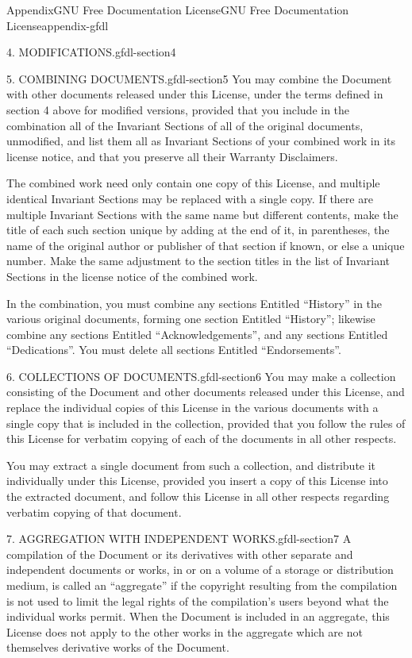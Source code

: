 \documentclass[oneside,10pt,]{book}
\numberwithin{equation}{section}
\begin{document}
\begin{appendixptx}{Appendix}{GNU Free Documentation License}{}{GNU Free Documentation License}{}{}{appendix-gfdl}
\begin{paragraphs}{4. MODIFICATIONS.}{gfdl-section4}
\end{paragraphs}%
\begin{paragraphs}{5. COMBINING DOCUMENTS.}{gfdl-section5}%
You may combine the Document with other documents released under this License, under the terms defined in section 4 above for modified versions, provided that you include in the combination all of the Invariant Sections of all of the original documents, unmodified, and list them all as Invariant Sections of your combined work in its license notice, and that you preserve all their Warranty Disclaimers.%
\par
The combined work need only contain one copy of this License, and multiple identical Invariant Sections may be replaced with a single copy. If there are multiple Invariant Sections with the same name but different contents, make the title of each such section unique by adding at the end of it, in parentheses, the name of the original author or publisher of that section if known, or else a unique number. Make the same adjustment to the section titles in the list of Invariant Sections in the license notice of the combined work.%
\par
In the combination, you must combine any sections Entitled ``History'' in the various original documents, forming one section Entitled ``History''; likewise combine any sections Entitled ``Acknowledgements'', and any sections Entitled ``Dedications''. You must delete all sections Entitled ``Endorsements''.%
\end{paragraphs}%
\begin{paragraphs}{6. COLLECTIONS OF DOCUMENTS.}{gfdl-section6}%
You may make a collection consisting of the Document and other documents released under this License, and replace the individual copies of this License in the various documents with a single copy that is included in the collection, provided that you follow the rules of this License for verbatim copying of each of the documents in all other respects.%
\par
You may extract a single document from such a collection, and distribute it individually under this License, provided you insert a copy of this License into the extracted document, and follow this License in all other respects regarding verbatim copying of that document.%
\end{paragraphs}%
\begin{paragraphs}{7. AGGREGATION WITH INDEPENDENT WORKS.}{gfdl-section7}%
A compilation of the Document or its derivatives with other separate and independent documents or works, in or on a volume of a storage or distribution medium, is called an ``aggregate'' if the copyright resulting from the compilation is not used to limit the legal rights of the compilation's users beyond what the individual works permit. When the Document is included in an aggregate, this License does not apply to the other works in the aggregate which are not themselves derivative works of the Document.%

\end{paragraphs}
\end{appendixptx}
\end{document}
